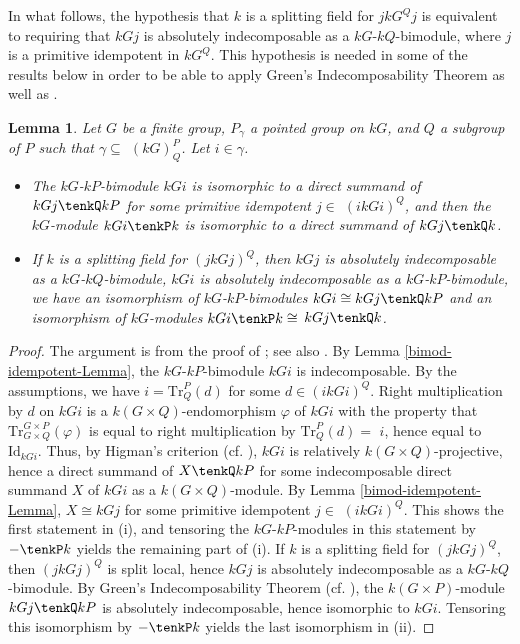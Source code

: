 \documentclass{amsart}
\theoremstyle{plain}\newtheorem{Theorem}{Theorem}[section]
\theoremstyle{plain}\newtheorem{Conjecture}[Theorem]{Conjecture}
\theoremstyle{plain}\newtheorem{Corollary}[Theorem]{Corollary}
\theoremstyle{plain}\newtheorem{Lemma}[Theorem]{Lemma}
\theoremstyle{plain}\newtheorem{Proposition}[Theorem]{Proposition}
\theoremstyle{definition}\newtheorem{Definition}[Theorem]{Definition}
\theoremstyle{definition}\newtheorem{Example}[Theorem]{Example}
\theoremstyle{definition}\newtheorem{Examples}[Theorem]{Examples}
\theoremstyle{definition}\newtheorem{Exercise}[Theorem]{Exercise}
\theoremstyle{definition}\newtheorem{Notation}[Theorem]{Notation}
\theoremstyle{definition}\newtheorem{Remark}[Theorem]{Remark}
\theoremstyle{definition}\newtheorem{Remarks}[Theorem]{Remarks}
\theoremstyle{plain}\newtheorem{Statement}[Theorem]{}
\def\Id{\mathrm{Id}}
\def\Tr{\mathrm{Tr}}             \def\tenOT{\otimes_{\mathcal{O}T}}
\begin{document}
In what follows, the hypothesis that $k$ is a splitting field for $jkG^Qj$ is
equivalent to requiring that $kGj$ is absolutely indecomposable as a 
$kG$-$kQ$-bimodule, where $j$ is a primitive idempotent in $kG^Q$. 
This hypothesis is needed in some of the results below in
order to be able to apply  Green's Indecomposability Theorem 
\cite[Theorem 5.12.3]{LiBookI}  as well as  \cite[Theorem 5.12.8]{LiBookI}. 


\begin{Lemma} \label{kGi-summands-R}
Let $G$ be a finite group, $P_\gamma$ a pointed group on $kG$, and $Q$ a 
subgroup of $P$ such that $\gamma\subseteq$ $(kG)^P_Q$. Let $i\in \gamma$.
\begin{itemize}
\item[{\rm (i)}]
The $kG$-$kP$-bimodule $kGi$ is isomorphic to a direct summand of 
$kGj\tenkQ kP$ for some primitive idempotent $j\in$ $(ikGi)^Q$, and then
the $kG$-module $kGi\tenkP k$ is isomorphic to a direct summand of $kGj\tenkQ k$.
\item[{\rm (ii)}]
If $k$ is a splitting field for $(jkGj)^Q$, then  $kGj$ is absolutely indecomposable
as a $kG$-$kQ$-bimodule, $kGi$ is absolutely indecomposable
as a $kG$-$kP$-bimodule, we have an isomorphism of $kG$-$kP$-bimodules 
$kGi\cong kGj\tenkQ kP$ and an isomorphism of $kG$-modules
$kGi\tenkP k\cong$ $kGj\tenkQ k$.
\end{itemize}
\end{Lemma}

\begin{proof} 
The argument is from the proof of \cite[Proposition 6.3]{LiKleinfour}; see
also \cite[Theorem 5.12.8]{LiBookI}. By   Lemma \ref{bimod-idempotent-Lemma},  
the $kG$-$kP$-bimodule  $kGi$ is  indecomposable. By the assumptions, we have  
$i=\Tr^P_Q(d)$ for some $d\in (ikGi)^Q$. Right multiplication by $d$ on $kGi$ is a 
$k(G\times Q)$-endomorphism $\varphi$ of $kGi$ with the property that
$\Tr^{G\times P}_{G\times Q}(\varphi)$ is equal to right multiplication by 
$\Tr^P_Q(d)=$ $i$, hence equal to $\Id_{kGi}$. Thus, by Higman's criterion 
(cf. \cite[Theorem 2.6.2]{LiBookI}), $kGi$ is relatively $k(G\times Q)$-projective,
hence a direct summand of $X\tenkQ kP$ for some indecomposable direct
summand $X$ of $kGi$ as a $k(G\times Q)$-module. By Lemma
\ref{bimod-idempotent-Lemma}, $X\cong kGj$ for some primitive
idempotent $j\in$ $(ikGi)^Q$. This shows the first statement in  (i), and
tensoring the $kG$-$kP$-modules in this statement by $-\tenkP k$ yields
the remaining part of (i). 
If $k$ is a splitting field for $(jkGj)^Q$, then $(jkGj)^Q$ is split local,
hence $kGj$ is absolutely indecomposable as a $kG$-$kQ$-bimodule.
By Green's Indecomposability Theorem (cf. \cite[Theorem 5.12.3]{LiBookI}),
the $k(G\times P)$-module $kGj\tenkQ kP$ is absolutely indecomposable,
hence isomorphic to $kGi$. Tensoring this isomorphism  by $-\tenkP k$  yields
the last isomorphism in (ii).
\end{proof}
\end{document}
